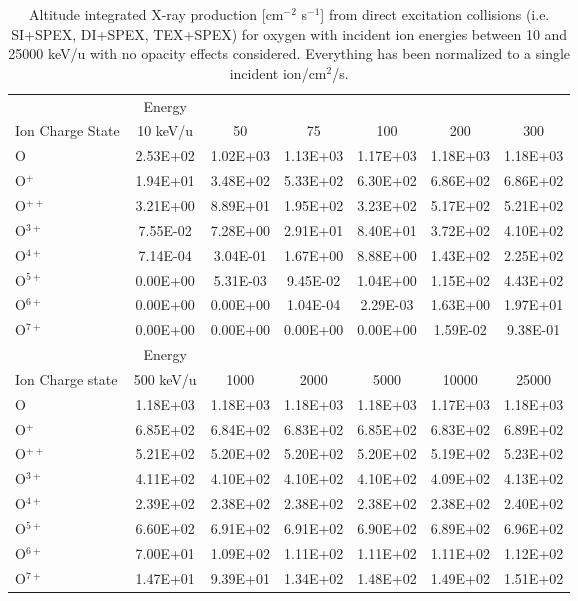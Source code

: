 \begin{table}[ht]
    \centering
    \caption{Altitude integrated X-ray production [cm$^{-2}$ s$^{-1}$] from direct excitation collisions (i.e. SI+SPEX, DI+SPEX, TEX+SPEX) for oxygen with incident ion energies between 10 and 25000 keV/u with no opacity effects considered. Everything has been normalized to a single incident ion/cm$^2$/s.}
    \begin{tabular}{l|c|c|c|c|c|c}
    \hline
    & Energy & & & & & \\
    Ion Charge State & 10 keV/u & 50 & 75 & 100 & 200 & 300 \\
    \hline
    O & 2.53E+02 & 1.02E+03 & 1.13E+03 & 1.17E+03 & 1.18E+03 & 1.18E+03 \\
    O$^+$ & 1.94E+01 & 3.48E+02 & 5.33E+02 & 6.30E+02 & 6.86E+02 & 6.86E+02 \\
    O$^{++}$ & 3.21E+00 & 8.89E+01 & 1.95E+02 & 3.23E+02 & 5.17E+02 & 5.21E+02 \\
    O$^{3+}$ & 7.55E-02 & 7.28E+00 & 2.91E+01 & 8.40E+01 & 3.72E+02 & 4.10E+02 \\
    O$^{4+}$ & 7.14E-04 & 3.04E-01 & 1.67E+00 & 8.88E+00 & 1.43E+02 & 2.25E+02 \\
    O$^{5+}$ & 0.00E+00 & 5.31E-03 & 9.45E-02 & 1.04E+00 & 1.15E+02 & 4.43E+02 \\
    O$^{6+}$ & 0.00E+00 & 0.00E+00 & 1.04E-04 & 2.29E-03 & 1.63E+00 & 1.97E+01 \\
    O$^{7+}$ & 0.00E+00 & 0.00E+00 & 0.00E+00 & 0.00E+00 & 1.59E-02 & 9.38E-01 \\
    \hline
    \hline
    & Energy & & & & & \\
    Ion Charge state & 500 keV/u & 1000 & 2000 & 5000 & 10000 & 25000 \\
    \hline
    O & 1.18E+03 & 1.18E+03 & 1.18E+03 & 1.18E+03 & 1.17E+03 & 1.18E+03 \\
    O$^+$ & 6.85E+02 & 6.84E+02 & 6.83E+02 & 6.85E+02 & 6.83E+02 & 6.89E+02 \\
    O$^{++}$ & 5.21E+02 & 5.20E+02 & 5.20E+02 & 5.20E+02 & 5.19E+02 & 5.23E+02 \\
    O$^{3+}$ & 4.11E+02 & 4.10E+02 & 4.10E+02 & 4.10E+02 & 4.09E+02 & 4.13E+02 \\
    O$^{4+}$ & 2.39E+02 & 2.38E+02 & 2.38E+02 & 2.38E+02 & 2.38E+02 & 2.40E+02 \\
    O$^{5+}$ & 6.60E+02 & 6.91E+02 & 6.91E+02 & 6.90E+02 & 6.89E+02 & 6.96E+02 \\
    O$^{6+}$ & 7.00E+01 & 1.09E+02 & 1.11E+02 & 1.11E+02 & 1.11E+02 & 1.12E+02 \\
    O$^{7+}$ & 1.47E+01 & 9.39E+01 & 1.34E+02 & 1.48E+02 & 1.49E+02 & 1.51E+02 \\
    \hline
    \end{tabular}
    \label{tab:OxyDEProd}
\end{table}

